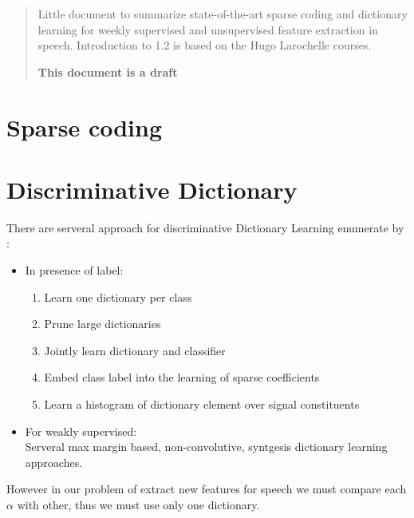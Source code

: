 \documentclass[a4paper,10pt]{article}
\begin{document}
\begin{abstract}
Little document to summarize state-of-the-art sparse coding and dictionary learning for weekly supervised and unsupervised feature extraction in speech. Introduction to 1.2 is based on the Hugo Larochelle courses.\\
\begin{center}

\textbf{This document is a draft }
 
\end{center}
\end{abstract}


\tableofcontents


\section{Sparse coding}





\newpage
\section{Discriminative Dictionary }
There are serveral approach for discriminative Dictionary Learning enumerate by \cite{8294264}:
\begin{itemize}
 \item In presence of label:
    \begin{enumerate}
     \item Learn one dictionary per class
     \item Prune large dictionaries
     \item Jointly learn dictionary and classifier
     \item Embed class label into the learning of sparse coefficients
     \item Learn a histogram of dictionary element over signal constituents
    \end{enumerate}

 \item For weakly supervised:\\
    Serveral max margin based, non-convolutive, syntgesis dictionary learning approaches.
\end{itemize}
However in our problem of extract new features for speech we must compare each $\alpha$ with other, thus we must use only one dictionary.




\newpage

\newpage
\newpage

\newpage
\end{document}
